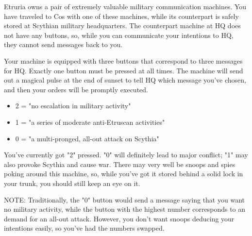 \documentclass[green]{Kos}
\begin{document}
\name{\gScythiaMachine{}}

Etruria owns a pair of extremely valuable military communication machines. You have traveled to Cos with one of these machines, while its counterpart is safely stored at Scythian military headquarters. The counterpart machine at HQ does not have any buttons, so, while you can communicate your intentions to HQ, they cannot send messages back to you. 

Your machine is equipped with three buttons that correspond to three messages for HQ. Exactly one button must be pressed at all times. The machine will send out a magical pulse at the end of sunset to tell HQ which message you've chosen, and then your orders will be promptly executed.

\begin{itemize}
\item 2 = "no escalation in military activity"
\item 1 = "a series of moderate anti-Etruscan activities"
\item 0 = "a multi-pronged, all-out attack on Scythia"
\end{itemize}


You've currently got "2" pressed. "0" will definitely lead to major conflict; "1" may also provoke Scythia and cause war. There may very well be snoops and spies poking around this machine, so, while you've got it stored behind a solid lock in your trunk, you should still keep an eye on it.

NOTE: Traditionally, the "0" button would send a message saying that you want no military activity, while the button with the highest number corresponds to an demand for an all-out attack. However, you don't want snoops deducing your intentions easily, so you've had the numbers swapped.
\end{document}
